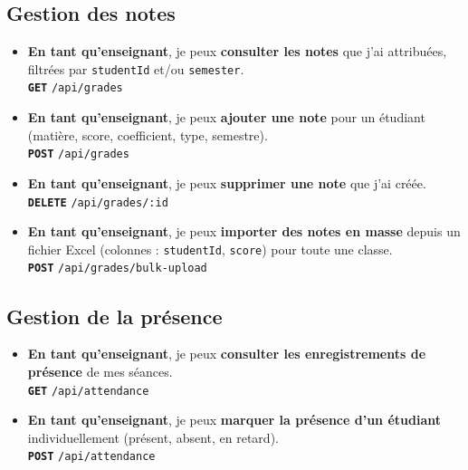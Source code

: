 \documentclass[12pt,a4paper]{article}
\newcommand{\route}[1]{\texorpdfstring{\texttt{\small\color{routeGray}#1}}{#1}}
\newcommand{\httpmethod}[1]{%
  \ifstrequal{#1}{GET}{\colorbox{blue!15}{\texttt{\bfseries\color{blue!70!black}GET}}}{}%
  \ifstrequal{#1}{POST}{\colorbox{green!18}{\texttt{\bfseries\color{green!60!black}POST}}}{}%
  \ifstrequal{#1}{PUT}{\colorbox{orange!18}{\texttt{\bfseries\color{orange!70!black}PUT}}}{}%
  \ifstrequal{#1}{DELETE}{\colorbox{red!15}{\texttt{\bfseries\color{red!70!black}DELETE}}}{}%
}
\newcommand{\usmark}{\color{accentGold}$\blacktriangleright$\;}
\begin{document}
\begin{teacherbox}
\subsection*{Gestion des notes}

\begin{itemize}[leftmargin=1.2cm, labelsep=0.4cm]
  \item[\usmark] \textbf{En tant qu'enseignant}, je peux \textbf{consulter les notes} que j'ai attribuées, filtrées par \texttt{studentId} et/ou \texttt{semester}.\\
    \httpmethod{GET} \route{/api/grades}

  \item[\usmark] \textbf{En tant qu'enseignant}, je peux \textbf{ajouter une note} pour un étudiant (matière, score, coefficient, type, semestre).\\
    \httpmethod{POST} \route{/api/grades}

  \item[\usmark] \textbf{En tant qu'enseignant}, je peux \textbf{supprimer une note} que j'ai créée.\\
    \httpmethod{DELETE} \route{/api/grades/:id}

  \item[\usmark] \textbf{En tant qu'enseignant}, je peux \textbf{importer des notes en masse} depuis un fichier Excel (colonnes : \texttt{studentId}, \texttt{score}) pour toute une classe.\\
    \httpmethod{POST} \route{/api/grades/bulk-upload}
\end{itemize}

\subsection*{Gestion de la présence}

\begin{itemize}[leftmargin=1.2cm, labelsep=0.4cm]
  \item[\usmark] \textbf{En tant qu'enseignant}, je peux \textbf{consulter les enregistrements de présence} de mes séances.\\
    \httpmethod{GET} \route{/api/attendance}

  \item[\usmark] \textbf{En tant qu'enseignant}, je peux \textbf{marquer la présence d'un étudiant} individuellement (présent, absent, en retard).\\
    \httpmethod{POST} \route{/api/attendance}


\end{itemize}
\end{teacherbox}
\end{document}
